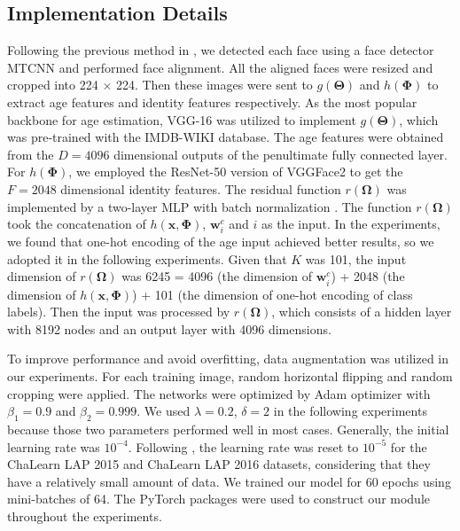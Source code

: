 \documentclass[journal,twoside]{IEEEtran}
\begin{document}
\subsection{Implementation Details}
Following the previous method in \cite{li2019bridgenet}, we detected each face using a face detector MTCNN \cite{zhang2016joint} and performed face alignment.  All the aligned faces were resized and cropped into 224 $\times$ 224. Then these images were sent to $g(\bm{\Theta})$ and $h(\bm{\Phi})$ to extract age features and identity features respectively. As the most popular backbone \cite{li2019bridgenet,pan2018mean,shen2018deep,rothe2018deep} for age estimation, VGG-16 was utilized to implement $g(\bm{\Theta})$, which was pre-trained with the IMDB-WIKI database. The age features were obtained from the $D=4096$ dimensional outputs of the penultimate fully connected layer. For $h(\bm{\Phi})$, we employed the ResNet-50 version of VGGFace2 \cite{cao2018vggface2} to get the $F=2048$ dimensional identity features. The residual function $r(\bm{\Omega})$ was implemented by a two-layer MLP with batch normalization \cite{pmlr-v37-ioffe15}. The function $r(\bm{\Omega})$ took the concatenation of $h(\bm{x},\bm{\Phi})$, $\bm{w}_i^c$ and $i$ as the input. In the experiments, we found that one-hot encoding of the age input achieved better results, so we adopted it in the following experiments. Given that $K$ was 101, the input dimension of $r(\bm{\Omega})$ was 6245 = 4096 (the dimension of $\bm{w}_i^c$) + 2048 (the dimension of $h(\bm{x},\bm{\Phi})$) + 101 (the dimension of one-hot encoding of class labels). Then the input was processed by $r(\bm{\Omega})$, which consists of a hidden layer with 8192 nodes and an output layer with 4096 dimensions.



To improve performance and avoid overfitting, data augmentation was utilized in our experiments. For each training image, random horizontal flipping and random cropping were applied.
The networks were optimized by Adam optimizer \cite{kingma2015adam} with $\beta_1=0.9$ and $\beta_2 =0.999$. We used $\lambda = 0.2$, $\delta = 2$ in the following experiments because those two parameters performed well in most cases. Generally, the initial learning rate was $10^{-4}$. Following \cite{li2019bridgenet}, the learning rate was reset to $10^{-5}$ for the ChaLearn LAP 2015 and  ChaLearn LAP 2016 datasets, considering that they have a relatively small amount of data. We trained our model for 60 epochs using mini-batches of 64.
The PyTorch \cite{Paszke2019PyTorch} packages were used to construct our module throughout the experiments.
\end{document}
